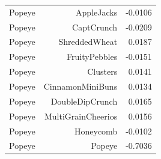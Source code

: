 \begin{longtable}{@{}lrr@{}}
Popeye & AppleJacks & -0.0106 \\
Popeye & CaptCrunch & -0.0209 \\
Popeye & ShreddedWheat & 0.0187 \\
Popeye & FruityPebbles & -0.0151 \\
Popeye & Clusters & 0.0141 \\
Popeye & CinnamonMiniBuns & 0.0134 \\
Popeye & DoubleDipCrunch & 0.0165 \\
Popeye & MultiGrainCheerios & 0.0156 \\
Popeye & Honeycomb & -0.0102 \\
Popeye & Popeye & -0.7036 \\
\bottomrule
\end{longtable}
\endgroup